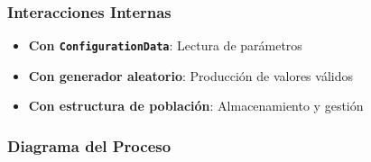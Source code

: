 \subsubsection{Interacciones Internas}
\begin{itemize}
    \item \textbf{Con \texttt{ConfigurationData}}: Lectura de parámetros
    \item \textbf{Con generador aleatorio}: Producción de valores válidos
    \item \textbf{Con estructura de población}: Almacenamiento y gestión
\end{itemize}
\newpage
\subsubsection{Diagrama del Proceso}
\begin{figure}[H]
    \centering
\end{figure}
